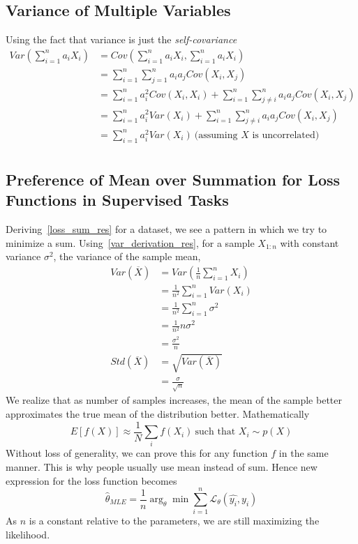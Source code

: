 \documentclass{article}
\numberwithin{equation}{subsection}
\begin{document}
\subsection{Variance of Multiple Variables}
Using the fact that variance is just the \textit{self-covariance}
\begin{align}
    Var(\sum_{i=1}^{n} a_i X_i) &= Cov(\sum_{i=1}^{n} a_i X_i, \sum_{i=1}^{n} a_i X_i)\\
    &= \sum_{i=1}^{n} \sum_{j=1}^{n} a_i a_j Cov(X_i, X_j)\\
    &= \sum_{i=1}^{n} a_i^2 Cov(X_i, X_i) + \sum_{i=1}^{n} \sum_{j \neq i}^{n} a_i a_j Cov(X_i, X_j)\\
    &= \sum_{i=1}^{n} a_i^2 Var(X_i) + \sum_{i=1}^{n} \sum_{j \neq i}^{n} a_i a_j Cov(X_i, X_j)\\
    &= \sum_{i=1}^{n} a_i^2 Var(X_i)\ \text{(assuming $X$ is uncorrelated)}\label{var_derivation_res}\\
\end{align}
\subsection{Preference of Mean over Summation for Loss Functions in Supervised Tasks}
\label{mean_loss}
Deriving~\ref{loss_sum_res} for a dataset, we see a pattern in which we try to minimize a sum.
Using~\ref{var_derivation_res}, for a sample $X_{1:n}$ with constant variance $\sigma^2$, the variance of the sample mean,
\begin{align}
    Var(\overline{X}) &= Var(\frac{1}{n}\sum_{i=1}^{n} X_i)\\
    &= \frac{1}{n^2} \sum_{i=1}^{n} Var(X_i)\\
    &= \frac{1}{n^2} \sum_{i=1}^{n} \sigma^2\\
    &= \frac{1}{n^2} n \sigma^2\\
    &= \frac{\sigma^2}{n}\\
    Std(\overline{X}) &= \sqrt{Var(\overline{X})}\\
    &= \frac{\sigma}{\sqrt{n}}
\end{align}
We realize that as number of samples increases, the mean of the sample better approximates the true mean of the distribution better. Mathematically
\begin{equation}
    E[f(X)] \approx \frac{1}{N}\sum_i f(X_i)\ \text{such that $X_i \sim p(X)$}\label{mean_loss_res}
\end{equation}
Without loss of generality, we can prove this for any function $f$ in the same manner. This is why people usually use mean instead of sum. Hence new expression for the loss function becomes 
\begin{equation}
    \hat{\theta}_{MLE} = \frac{1}{n}\arg_\theta \min \sum_{i=1}^n \mathcal{L}_\theta(\hat{y_i},y_i)
\end{equation}
As $n$ is a constant relative to the parameters, we are still maximizing the likelihood. 
\end{document}
